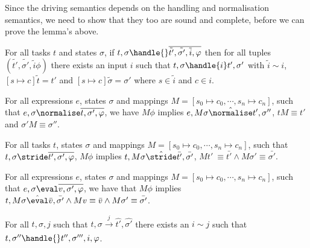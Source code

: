 Since the driving semantics depends on the handling and normalisation semantics, we need to show that they too are sound and complete, before we can prove the lemma's above.


\begin{lemma}
  \label{lem:soundhandle}

  For all tasks $t$ and states $\sigma$,
  if $t,\sigma\handle{}\overline{\tilde{t'},\tilde{\sigma'},\tilde{i},\phi}$
  then for all tuples $(\tilde{t'},\tilde{\sigma'},\tilde{i}\phi)$
  there exists an input $i$ such that $t,\sigma\handle{i}t',\sigma'$
  with $\tilde{i}\sim i$, $[s\mapsto c]\tilde{t}=t'$ and $[s\mapsto c]\tilde{\sigma}=\sigma'$ where $s\in \tilde{i}$ and $c\in i$.
  
\end{lemma}

\begin{lemma}
  \label{lem:soundnorm}

  For all expressions $e$, states $\sigma$ and mappings $M=[s_0\mapsto c_0,\cdots,s_n\mapsto c_n]$,
  such that $e,\sigma\normalise \overline{t,\sigma',\phi}$,
  we have $M\phi$ implies
  $e,M \sigma \hat{\normalise}t',\sigma''$, $t M \equiv t'$ and $\sigma' M \equiv \sigma''$.
\end{lemma}

\begin{lemma}
  For all tasks $t$, states $\sigma$ and mappings $M=[s_0\mapsto c_0,\cdots,s_n\mapsto c_n]$,
such that $t,\sigma\stride \overline{t',\sigma',\phi}$,
$M \phi$ implies
$t,M\sigma \hat{\stride}\bar{t'},\bar{\sigma'}$, $M t'\ \equiv \bar{t'} \land M\sigma' \equiv \bar{\sigma'}$.
\end{lemma}

\begin{lemma}
  For all expressions $e$, states $\sigma$ and mappings $M=[s_0\mapsto c_0,\cdots,s_n\mapsto c_n]$,
such that $e,\sigma\eval \overline{v,\sigma',\phi}$,
we have that $M\phi$ implies
$t,M\sigma \hat{\eval}\bar{v},\bar{\sigma'} \land Mv \equiv \bar{v} \wedge M\sigma' \equiv \bar{\sigma'}$.
\end{lemma}

\begin{lemma}
  \label{lem:completeHandle}
    For all $t,\sigma,j$ such that $t,\sigma \xrightarrow[]{j} \hat{t'},\hat{\sigma'}$
    there exists an $i\sim j$ such that $t,\sigma''\handle{} t'',\sigma''',i,\phi$.
\end{lemma}

